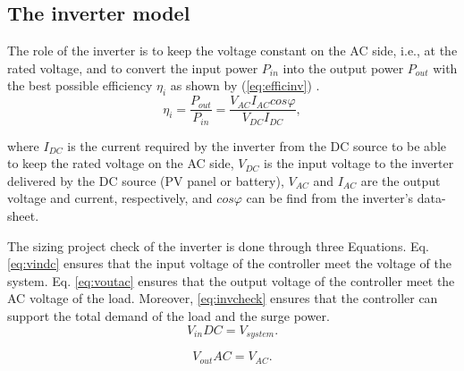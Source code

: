 \documentclass[journal]{IEEEtran}
\begin{document}
\subsection{The inverter model}
The role of the inverter is to keep the voltage constant on the AC side, i.e., at the rated voltage, %
and to convert the input power $ P_{in} $ into the output power $ P_{out} $ with the best possible efficiency $ \eta_{i} $ as shown by (\ref{eq:efficinv}) \cite{Hansen}.
%
\begin{equation}
\label{eq:efficinv}
\eta_{i} = \dfrac{P_{out}}{P_{in}} = \dfrac{V_{AC} I_{AC} cos\varphi}{V_{DC}I_{DC}},
\end{equation}

\noindent where $ I_{DC} $ is the current required by the inverter from the DC source to be able to keep the rated voltage on the AC side, $ V_{DC} $ is the input voltage to the inverter delivered by the DC source (PV panel or battery),  $ V_{AC}  $ and $ I_{AC} $ are the output voltage and current, respectively, and $ cos \varphi $ can be find from the inverter's data-sheet.

%
The sizing project check of the inverter is done through three Equations. Eq. \eqref{eq:vindc} ensures that the input voltage of the controller meet the voltage of the system. Eq. \eqref{eq:voutac} ensures that the output voltage of the controller meet the AC voltage of the load. Moreover, \eqref{eq:invcheck} ensures that the controller can support the total demand of the load and the surge power.
\begin{equation}
\label{eq:vindc} 
V_{in}DC = V_{system}.
\end{equation}

\begin{equation}
\label{eq:voutac} 
V_{out}AC = V_{AC}.
\end{equation}
\end{document}
